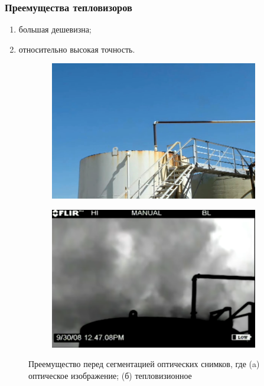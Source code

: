 \documentclass[t]{beamer}
\begin{document}
	\begin{frame}
		\frametitle{Преемущества тепловизоров}
		\begin{enumerate}
			\justifying
			\item большая дешевизна;
			\item относительно высокая точность.
		\end{enumerate}
		\begin{figure}[ht!]
			\begin{subfigure}{.4\textwidth}
				\centering
				\includegraphics[width = \textwidth]{image/optic_invis}
				\caption{}
			\end{subfigure}
			\begin{subfigure}{.4\textwidth}
				\centering
				\includegraphics[width = \textwidth]{image/tep_vis}
				\caption{}
			\end{subfigure}
			\centering
			\caption{Преемущество перед сегментацией оптических снимков, где (a) оптическое изображение; (б) тепловизионное}
			\label{fig:Examples}
		\end{figure}
	\end{frame}
\end{document}
